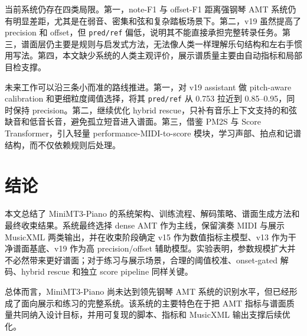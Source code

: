 \documentclass[UTF8,a4paper,zihao=-4]{ctexart}
\newcommand{\code}[1]{\texttt{#1}}
\begin{document}
当前系统仍存在四类局限。第一，note-F1 与 offset-F1 距离强钢琴 AMT 系统仍有明显差距，尤其是在弱音、密集和弦和复杂踏板场景下。第二，v19 虽然提高了 precision 和 offset，但 \code{pred/ref} 偏低，说明其不能直接承担完整转录任务。第三，谱面层仍主要是规则与启发式方法，无法像人类一样理解乐句结构和左右手惯用写法。第四，本文缺少系统的人类主观评价，展示谱质量主要由自动指标和局部目检支撑。

未来工作可以沿三条小而准的路线推进。第一，对 v19 assistant 做 pitch-aware calibration 和更细粒度阈值选择，将其 \code{pred/ref} 从 0.753 拉近到 0.85--0.95，同时保持 precision。第二，继续优化 hybrid rescue，只补有音乐上下文支持的和弦缺音和低音长音，避免孤立短音进入谱面。第三，借鉴 PM2S 与 Score Transformer，引入轻量 performance-MIDI-to-score 模块，学习声部、拍点和记谱结构，而不仅依赖规则后处理。

\section{结论}

本文总结了 MiniMT3-Piano 的系统架构、训练流程、解码策略、谱面生成方法和最终收束结果。系统最终选择 dense AMT 作为主线，保留演奏 MIDI 与展示 MusicXML 两类输出，并在收束阶段确定 v15 作为数值指标主模型、v13 作为干净谱面基底、v19 作为高 precision/offset 辅助模型。实验表明，参数规模扩大并不必然带来更好谱面；对于练习与展示场景，合理的阈值校准、onset-gated 解码、hybrid rescue 和独立 score pipeline 同样关键。

总体而言，MiniMT3-Piano 尚未达到领先钢琴 AMT 系统的识别水平，但已经形成了面向展示和练习的完整系统。该系统的主要特色在于把 AMT 指标与谱面质量共同纳入设计目标，并用可复现的脚本、指标和 MusicXML 输出支撑后续优化。



\end{document}
